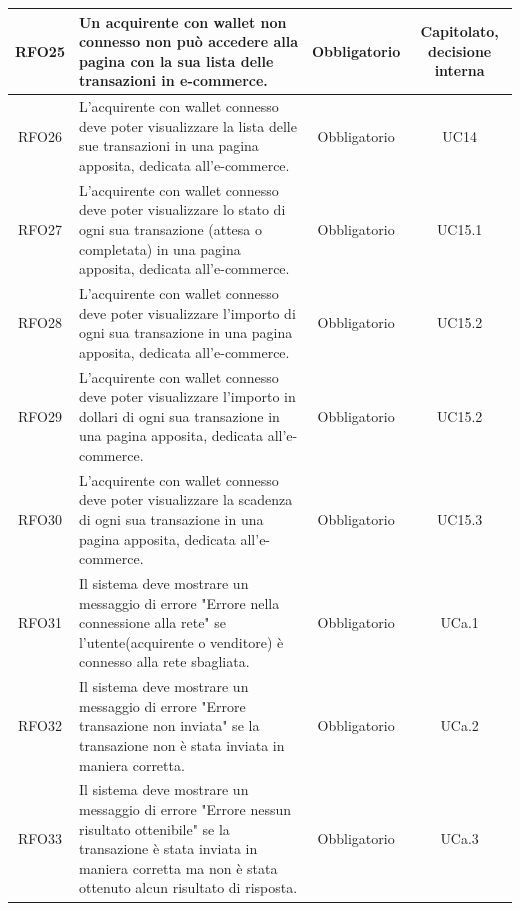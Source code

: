 \documentclass[a4paper, 12pt]{article}
\begin{document}
\begin{longtable}{|c|p{5cm}|c|c|}
\hline
RFO25 & Un acquirente con wallet non connesso non può accedere alla pagina con la sua lista delle transazioni in e-commerce. & Obbligatorio & Capitolato, decisione interna \\
\hline
RFO26 & L'acquirente con wallet connesso deve poter visualizzare la lista delle sue transazioni in una pagina apposita, dedicata all'e-commerce. & Obbligatorio & UC14 \\
\hline
RFO27 & L'acquirente con wallet connesso deve poter visualizzare lo stato di ogni sua transazione (attesa o completata) in una pagina apposita, dedicata all'e-commerce. & Obbligatorio & UC15.1 \\
\hline
RFO28 & L'acquirente con wallet connesso deve poter visualizzare l'importo di ogni sua transazione in una pagina apposita, dedicata all'e-commerce. & Obbligatorio & UC15.2 \\
\hline
RFO29 & L'acquirente con wallet connesso deve poter visualizzare l'importo in dollari di ogni sua transazione in una pagina apposita, dedicata all'e-commerce. & Obbligatorio & UC15.2 \\
\hline
RFO30 & L'acquirente con wallet connesso deve poter visualizzare la scadenza di ogni sua transazione in una pagina apposita, dedicata all'e-commerce. & Obbligatorio & UC15.3 \\
\hline
RFO31 & Il sistema deve mostrare un messaggio di errore "Errore nella connessione alla rete" se l'utente(acquirente o venditore) è connesso alla rete sbagliata. & Obbligatorio & UCa.1 \\
\hline
RFO32 & Il sistema deve mostrare un messaggio di errore "Errore transazione non inviata" se la transazione non è stata inviata in maniera corretta. & Obbligatorio & UCa.2 \\
\hline
RFO33 & Il sistema deve mostrare un messaggio di errore "Errore nessun risultato ottenibile" se la transazione è stata inviata in maniera corretta ma non è stata ottenuto alcun risultato di risposta. & Obbligatorio & UCa.3 \\
\hline

\end{longtable}
\pagebreak
\end{document}
